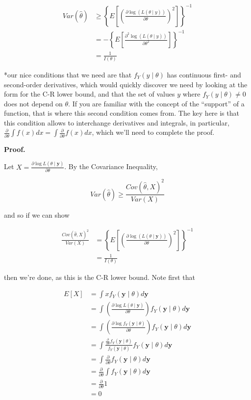 \documentclass[
  letterpaper,
  DIV=11,
  numbers=noendperiod]{scrreprt}
\begin{document}
\begin{align*} 
Var(\hat{\theta}) & \geq \left\{ E\left[ \left( \frac{\partial \log( L(\theta \mid y))}{\partial \theta}\right)^2\right]\right\}^{-1} \\
& = -\left\{ E\left[ \frac{\partial^2 \log( L(\theta \mid y))}{\partial \theta^2} \right] \right\}^{-1} \\
& = \frac{1}{I(\theta)}
\end{align*}

*our nice conditions that we need are that \(f_Y(y \mid \theta)\) has
continuous first- and second-order derivatives, which would quickly
discover we need by looking at the form for the C-R lower bound, and
that the set of values \(y\) where \(f_Y(y \mid \theta) \neq 0\) does
not depend on \(\theta\). If you are familiar with the concept of the
``support'' of a function, that is where this second condition comes
from. The key here is that this condition allows to interchange
derivatives and integrals, in particular,
\(\frac{\partial}{\partial \theta} \int f(x) dx = \int \frac{\partial}{\partial \theta} f(x)dx\),
which we'll need to complete the proof.

\textbf{Proof.}

Let
\(X = \frac{\partial \log L(\theta \mid \textbf{y})}{\partial \theta}\).
By the Covariance Inequality,

\[
Var(\hat{\theta}) \geq \frac{Cov(\hat{\theta},X)^2}{Var(X)}
\]

and so if we can show

\begin{align*} 
\frac{Cov(\hat{\theta},X)^2}{Var(X)} & = \left\{ E\left[ \left( \frac{\partial \log( L(\theta \mid \textbf{y}))}{\partial \theta}\right)^2\right]\right\}^{-1}  \\
& = \frac{1}{I(\theta)}
\end{align*}

then we're done, as this is the C-R lower bound. Note first that

\begin{align*} 
E[X] & = \int x f_Y(\textbf{y} \mid \theta) d\textbf{y} \\
& = \int \left( \frac{\partial \log L(\theta \mid \textbf{y})}{\partial \theta} \right)  f_Y(\textbf{y} \mid \theta) d\textbf{y} \\
& = \int \left( \frac{\partial \log f_Y(\textbf{y} \mid \theta)}{\partial \theta} \right)  f_Y(\textbf{y} \mid \theta) d\textbf{y} \\
& = \int \frac{\frac{\partial}{\partial \theta} f_Y(\textbf{y} \mid \theta)}{ f_Y(\textbf{y} \mid \theta)} f_Y(\textbf{y} \mid \theta) d\textbf{y} \\
& = \int \frac{\partial}{\partial \theta} f_Y (\textbf{y} \mid \theta) d\textbf{y} \\
& = \frac{\partial}{\partial \theta} \int f_Y(\textbf{y} \mid \theta) d\textbf{y} \\
& = \frac{\partial}{\partial \theta} 1 \\
& = 0
\end{align*}
\end{document}
